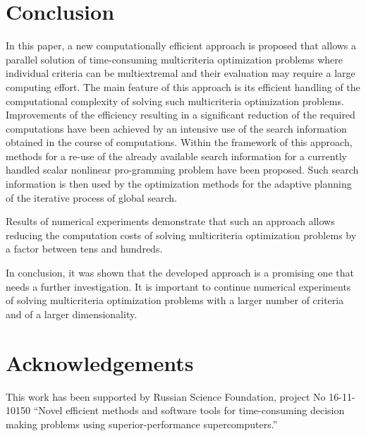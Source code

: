\documentclass[runningheads]{llncs}
\begin{document}
\section{Conclusion}
\label{sec:5}
In this paper, a new computationally efficient approach is proposed that allows a parallel solution of time-consuming multicriteria optimization problems where individual criteria can be multiextremal and their evaluation may require a large computing effort. The main feature of this approach is its efficient handling of the computational complexity of solving such multicriteria optimization problems. Improvements of the efficiency resulting in a significant reduction of the required computations have been achieved by an intensive use of the search information obtained in the course of computations. Within the framework of this approach, methods for a re-use of the already available search information for a currently handled scalar nonlinear pro-gramming problem have been proposed. Such search information is then used by the optimization methods for the adaptive planning of the iterative process of global search.

Results of numerical experiments demonstrate that such an approach allows reducing the computation costs of solving multicriteria optimization problems by a factor between tens and hundreds. 

In conclusion, it was shown that the developed approach is a promising one that needs a further investigation. It is important to continue numerical experiments of solving multicriteria optimization problems with a larger number of criteria and of a larger dimensionality. 

\section*{Acknowledgements}
This work has been supported by Russian Science Foundation, project No 16-11-10150 ``Novel efficient methods and software tools for time-consuming decision making problems using superior-performance supercomputers.''


\end{document}
